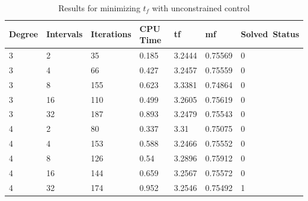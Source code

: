 \documentclass[]{article}
\begin{document}
\begin{table}
	\begin{tabular}{lllllll}
		Degree & Intervals & Iterations & CPU Time & tf & mf & Solved\ Status \\ 
		\hline 
		3 & 2 & 35 & 0.185 & 3.2444 & 0.75569 & 0 \\ 
		3 & 4 & 66 & 0.427 & 3.2457 & 0.75559 & 0 \\ 
		3 & 8 & 155 & 0.623 & 3.3381 & 0.74864 & 0 \\ 
		3 & 16 & 110 & 0.499 & 3.2605 & 0.75619 & 0 \\ 
		3 & 32 & 187 & 0.893 & 3.2479 & 0.75543 & 0 \\ 
		4 & 2 & 80 & 0.337 & 3.31 & 0.75075 & 0 \\ 
		4 & 4 & 153 & 0.588 & 3.2466 & 0.75552 & 0 \\ 
		4 & 8 & 126 & 0.54 & 3.2896 & 0.75912 & 0 \\ 
		4 & 16 & 144 & 0.659 & 3.2567 & 0.75572 & 0 \\ 
		4 & 32 & 174 & 0.952 & 3.2546 & 0.75492 & 1 \\ 
		\hline 
	\end{tabular}
	\caption{Results for minimizing \(t_f\) with unconstrained control}
	\label{table:1}
\end{table}
\FloatBarrier
\end{document}
